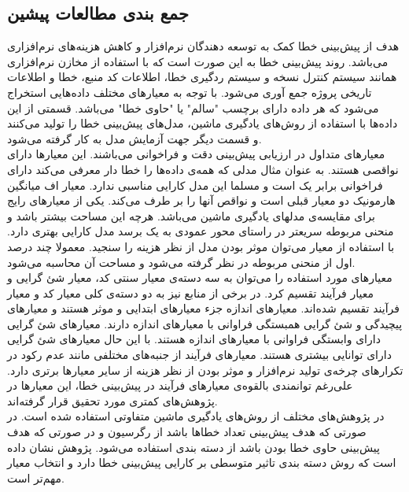 \subsection{جمع بندی مطالعات پیشین}
هدف از پیش‌بینی خطا کمک به توسعه دهندگان نرم‌افزار و کاهش هزینه‌های نرم‌افزاری می‌باشد. روند پیش‌بینی خطا به این صورت است که با استفاده از مخازن نرم‌افزاری همانند سیستم کنترل نسخه و سیستم ردگیری خطا، اطلاعات کد منبع، خطا و اطلاعات تاریخی پروژه جمع آوری می‌شود. با توجه به معیارهای مختلف داده‌هایی استخراج می‌شود که هر داده دارای برچسب "سالم" یا "حاوی خطا" می‌باشد. قسمتی از این داده‌ها با استفاده از روش‌های یادگیری ماشین، مدل‌های پیش‌بینی خطا را تولید می‌کنند و قسمت دیگر جهت آزمایش مدل به کار گرفته می‌شود.\\

معیارهای متداول در ارزیابی پیش‌بینی دقت و فراخوانی می‌باشند. این معیارها دارای نواقصی هستند. به عنوان مثال مدلی که همه‌ی داده‌ها را خطا دار معرفی می‌کند دارای فراخوانی  برابر یک است و مسلما این مدل کارایی مناسبی ندارد. معیار اف  میانگین هارمونیک دو معیار قبلی است و نواقص آنها را بر طرف می‌کند. یکی از معیار‌های رایج برای مقایسه‌ی مدلهای یادگیری ماشین  می‌باشد. هرچه این مساحت بیشتر باشد و منحنی مربوطه سریعتر  در راستای محور عمودی  به یک برسد مدل کارایی بهتری دارد. با استفاده از معیار  می‌توان موثر بودن مدل از نظر هزینه را سنجید. معمولا چند درصد اول از منحنی مربوطه در نظر گرفته می‌شود و مساحت آن محاسبه می‌شود. \\

معیارهای مورد استفاده را می‌توان به سه دسته‌ی معیار سنتی کد، معیار شئ گرایی و معیار فرآیند تقسیم کرد. در برخی از منابع نیز  به دو دسته‌ی کلی معیار کد و معیار فرآیند تقسیم شده‌اند. معیارهای اندازه جزء معیارهای ابتدایی و موثر هستند و معیارهای پیچیدگی و شئ گرایی همبستگی فراوانی با معیارهای اندازه دارند. معیارهای شئ گرایی دارای وابستگی فراوانی با معیار‌های اندازه هستند. با این حال معیارهای شئ گرایی دارای توانایی بیشتری هستند. معیارهای فرآیند از جنبه‌های مختلفی  مانند عدم رکود در تکرار‌های چرخه‌ی تولید نرم‌افزار و موثر بودن از نظر هزینه از سایر معیارها برتری دارد. علی‌رغم توانمندی بالقوه‌ی معیارهای فرآیند در پیش‌بینی خطا، این معیارها در پژوهش‌های کمتری مورد تحقیق قرار گرفته‌اند. \\

در پژوهش‌های مختلف از روش‌های یادگیری ماشین متفاوتی استفاده شده است. در صورتی که هدف پیش‌بینی تعداد خطاها باشد از رگرسیون و در صورتی که هدف پیش‌بینی حاوی خطا بودن باشد از دسته بندی استفاده می‌شود. پژوهش \cite{arisholm2010systematic}  نشان داده است که روش دسته بندی تاثیر متوسطی بر کارایی پیش‌بینی خطا دارد و انتخاب معیار مهم‌تر است. \\

